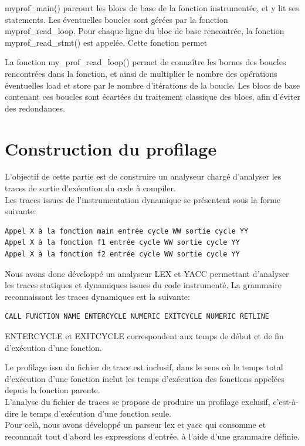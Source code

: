 \documentclass[oneside,11pt]{article}
\begin{document}
myprof\_main() parcourt les blocs de base de la fonction instrumentée, et y lit ses statements. Les éventuelles boucles sont gérées par la fonction myprof\_read\_loop.
Pour chaque ligne du bloc de base rencontrée, la fonction myprof\_read\_stmt() est appelée. Cette fonction permet 

La fonction my\_prof\_read\_loop() permet de connaître les bornes des boucles rencontrées dans la fonction, et ainsi de multiplier le nombre des opérations éventuelles load et store par le nombre d'itérations de la boucle. Les blocs de base contenant ces boucles sont écartées du traitement classique des blocs, afin d'éviter des redondances.

\section{Construction du profilage}

L'objectif de cette partie est de construire un analyseur chargé d'analyser les traces de sortie d'exécution du code à compiler.\\

Les traces issues de l'instrumentation dynamique se présentent sous la forme suivante:
\begin{verbatim}
Appel X à la fonction main entrée cycle WW sortie cycle YY
Appel X à la fonction f1 entrée cycle WW sortie cycle YY
Appel X à la fonction f2 entrée cycle WW sortie cycle YY
\end{verbatim}

Nous avons donc développé un analyseur LEX et YACC permettant d'analyser les traces statiques et dynamiques issues du code instrumenté.
La grammaire reconnaissant les traces dynamiques est la suivante:
\begin{verbatim}
CALL FUNCTION NAME ENTERCYCLE NUMERIC EXITCYCLE NUMERIC RETLINE
\end{verbatim}

ENTERCYCLE et EXITCYCLE correspondent aux temps de début et de fin d'exécution d'une fonction.

Le profilage issu du fichier de trace est inclusif, dans le sens où le temps total d'exécution d'une fonction inclut les temps d'exécution des fonctions appelées depuis la fonction parente.\\
L'analyse du fichier de traces se propose de produire un profilage exclusif, c'est-à-dire le temps d'exécution d'une fonction seule.\\
Pour celà, nous avons développé un parseur lex et yacc qui consomme et reconnnaît tout d'abord les expressions d'entrée, à l'aide d'une grammaire définie.\\
\end{document}

